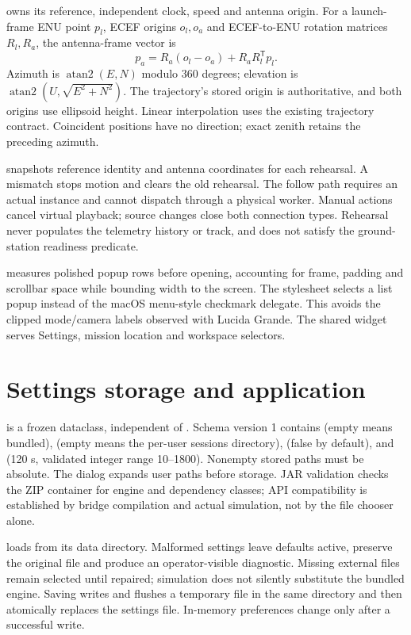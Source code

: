  owns its reference, independent clock, speed and antenna
origin. For a launch-frame ENU point $p_l$, ECEF origins $o_l,o_a$ and ECEF-to-ENU
rotation matrices $R_l,R_a$, the antenna-frame vector is
\[
p_a=R_a(o_l-o_a)+R_a R_l^{\mathsf T}p_l.
\]
Azimuth is $\operatorname{atan2}(E,N)$ modulo $360$ degrees; elevation is
$\operatorname{atan2}(U,\sqrt{E^2+N^2})$. The trajectory's stored origin is
authoritative, and both origins use ellipsoid height. Linear interpolation
uses the existing trajectory contract. Coincident positions have no direction;
exact zenith retains the preceding azimuth.

 snapshots reference identity and antenna coordinates for each
rehearsal. A mismatch stops motion and clears the old rehearsal. The follow path
requires an actual  instance and cannot dispatch through a
physical worker. Manual actions cancel virtual playback; source changes close
both connection types. Rehearsal never populates the telemetry history or track,
and does not satisfy the ground-station readiness predicate.

 measures polished popup rows before opening, accounting
for frame, padding and scrollbar space while bounding width to the screen.
The stylesheet selects a list popup instead of the macOS menu-style checkmark
delegate. This avoids the clipped mode/camera labels observed with Lucida Grande.
The shared widget serves Settings, mission location and workspace selectors.

\section{Settings storage and application}
 is a frozen dataclass, independent of .
Schema version 1 contains  (empty means bundled),
 (empty means the per-user sessions directory),
 (false by default), and  (120 s,
validated integer range 10--1800). Nonempty stored paths must be absolute.
The dialog expands user paths before storage. JAR validation checks the ZIP
container for engine and dependency classes; API compatibility is established
by bridge compilation and actual simulation, not by the file chooser alone.

 loads  from its data directory.
Malformed settings leave defaults active, preserve the original file and produce
an operator-visible diagnostic. Missing external files remain selected until
repaired; simulation does not silently substitute the bundled engine.
Saving writes and flushes a temporary file in the same directory and then
atomically replaces the settings file. In-memory preferences change only after
a successful write.

